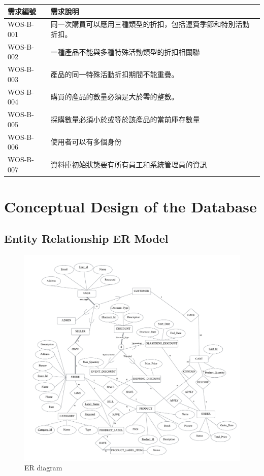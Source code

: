 \documentclass[a4paper, 12pt]{article}
\begin{document}
\noindent\begin{tabular}{ | p{6.5em} | p{32em} |}
\hline
需求編號 & 需求說明 \\ 
\hline
WOS-B-001 & 同一次購買可以應用三種類型的折扣，包括運費季節和特別活動折扣。\\
\hline
WOS-B-002 & 一種產品不能與多種特殊活動類型的折扣相關聯\\
\hline
WOS-B-003 & 產品的同一特殊活動折扣期間不能重疊。\\
\hline
WOS-B-004 & 購買的產品的數量必須是大於零的整數。\\
\hline
WOS-B-005 & 採購數量必須小於或等於該產品的當前庫存數量    \\
\hline
WOS-B-006 & 使用者可以有多個身份 \\
\hline
WOS-B-007 & 資料庫初始狀態要有所有員工和系統管理員的資訊 \\
\hline
\end{tabular}

\newpage

\section{Conceptual Design of the Database}
\subsection{Entity Relationship ER Model}

\begin{figure}[h]
    \centerline{\includegraphics[width=40em]{ER-diagram.png}}
    \caption{ER diagram}
    \label{fig:enter-label}
\end{figure}
\end{document}
